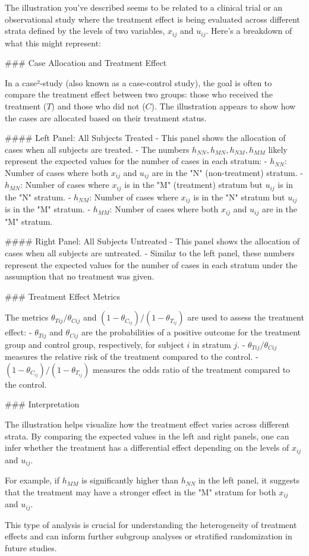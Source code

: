 The illustration you've described seems to be related to a clinical trial or an observational study where the treatment effect is being evaluated across different strata defined by the levels of two variables, \(x_{ij}\) and \(u_{ij}\). Here's a breakdown of what this might represent:

### Case Allocation and Treatment Effect

In a case²-study (also known as a case-control study), the goal is often to compare the treatment effect between two groups: those who received the treatment (\(T\)) and those who did not (\(C\)). The illustration appears to show how the cases are allocated based on their treatment status.

#### Left Panel: All Subjects Treated
- This panel shows the allocation of cases when all subjects are treated.
- The numbers \(h_{NN}, h_{MN}, h_{NM}, h_{MM}\) likely represent the expected values for the number of cases in each stratum:
  - \(h_{NN}\): Number of cases where both \(x_{ij}\) and \(u_{ij}\) are in the "N" (non-treatment) stratum.
  - \(h_{MN}\): Number of cases where \(x_{ij}\) is in the "M" (treatment) stratum but \(u_{ij}\) is in the "N" stratum.
  - \(h_{NM}\): Number of cases where \(x_{ij}\) is in the "N" stratum but \(u_{ij}\) is in the "M" stratum.
  - \(h_{MM}\): Number of cases where both \(x_{ij}\) and \(u_{ij}\) are in the "M" stratum.

#### Right Panel: All Subjects Untreated
- This panel shows the allocation of cases when all subjects are untreated.
- Similar to the left panel, these numbers represent the expected values for the number of cases in each stratum under the assumption that no treatment was given.

### Treatment Effect Metrics

The metrics \(\theta_{Tij}/\theta_{Cij}\) and \((1 - \theta_{C_{ij}})/(1 - \theta_{T_{ij}})\) are used to assess the treatment effect:
- \(\theta_{Tij}\) and \(\theta_{Cij}\) are the probabilities of a positive outcome for the treatment group and control group, respectively, for subject \(i\) in stratum \(j\).
- \(\theta_{Tij}/\theta_{Cij}\) measures the relative risk of the treatment compared to the control.
- \((1 - \theta_{C_{ij}})/(1 - \theta_{T_{ij}})\) measures the odds ratio of the treatment compared to the control.

### Interpretation

The illustration helps visualize how the treatment effect varies across different strata. By comparing the expected values in the left and right panels, one can infer whether the treatment has a differential effect depending on the levels of \(x_{ij}\) and \(u_{ij}\).

For example, if \(h_{MM}\) is significantly higher than \(h_{NN}\) in the left panel, it suggests that the treatment may have a stronger effect in the "M" stratum for both \(x_{ij}\) and \(u_{ij}\).

This type of analysis is crucial for understanding the heterogeneity of treatment effects and can inform further subgroup analyses or stratified randomization in future studies.